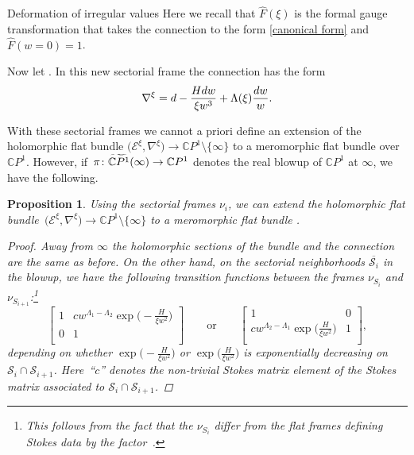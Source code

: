\documentclass[11pt]{article}
\numberwithin{equation}{section}
\newtheorem{Proposition}[Theorem]{Proposition}
 { \theoremstyle{definition}
\newtheorem{Definition}[Theorem]{Definition}
\newtheorem{Notation}[Theorem]{Notation}
\newtheorem{Example}[Theorem]{Example}
\newtheorem{Remark}[Theorem]{Remark} }
\numberwithin{equation}{section}
\newcommand{\CP}{\mathbb{C}P^1}
\begin{document}
\begin{subsubsection}{Deformation of irregular values}
Here we recall that $\widehat{F}(\xi)$ is the formal gauge transformation that takes the connection to the form \eqref{canonical form} and $\widehat{F}(w=0)=1$.

Now let . In this new sectorial frame the connection has the form
\begin{equation*}
 \nabla^{\xi}={\rm d}-\frac{H{\rm d}w}{\xi w^3}+\Lambda(\xi)\frac{{\rm d}w}{w}.
\end{equation*}

With these sectorial frames we cannot a priori define an extension of the holomorphic flat bundle $\bigl(\mathcal{E}^{\xi},\nabla^{\xi}\bigr)\to \CP \setminus \{\infty\}$ to a meromorphic flat bundle over $\CP$. However, if~$\smash{\pi\colon\widetilde{\CP}(\infty)}\to \CP$ denotes the real blowup of $\CP$ at $\infty$, we have the following.

\begin{Proposition} Using the sectorial frames $\nu_i$, we can extend the holomorphic flat bundle~${\bigl(\mathcal{E}^{\xi},\nabla^{\xi}\bigr)\to \CP \setminus \{\infty\}}$ to a meromorphic flat bundle \smash{$\bigl(\widetilde{\mathcal{E}}^{\xi},\widetilde{\nabla}^{\xi}\bigr)\to \bigl(\widetilde{\CP}(\infty),\pi^{-1}(\infty)\bigr)$}.

\begin{proof}
Away from $\infty$ the holomorphic sections of the bundle and the connection are the same as before. On the other hand, on the sectorial neighborhoods $\overline{\mathcal{S}_i}$ in the blowup, we have the following transition functions between the frames $\nu_{S_i}$ and $\nu_{S_{i+1}}$:\footnote{This follows from the fact that the $\nu_{S_i}$ differ from the flat frames defining Stokes data by the factor~.}
\begin{equation*}
 \begin{bmatrix}
 1 & cw^{\Lambda_1-\Lambda_2}\exp \bigl(-\frac{H}{\xi w^2}\bigr)\\
 0 & 1\\
 \end{bmatrix}
\qquad \text{or}\qquad
 \begin{bmatrix}
 1 & 0\\
 cw^{\Lambda_2-\Lambda_1}\exp \bigl(\frac{H}{\xi w^2}\bigr) & 1\\
 \end{bmatrix},
\end{equation*}
depending on whether $\exp \bigl(-\frac{H}{\xi w^2}\bigr)$ or $\exp \bigl(\frac{H}{\xi w^2}\bigr)$ is exponentially decreasing on $\mathcal{S}_i\cap \mathcal{S}_{i+1}$. Here~``$c$'' denotes the non-trivial Stokes matrix element of the Stokes matrix associated to $\mathcal{S}_i\cap \mathcal{S}_{i+1}$.


\end{proof}
\end{Proposition}
\end{subsubsection}
\end{document}
